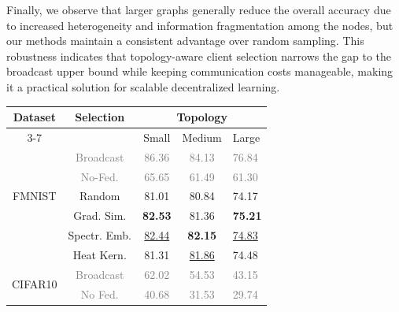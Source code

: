 \documentclass[journal]{IEEEtran}
\begin{document}
Finally, we observe that larger graphs generally reduce the overall accuracy due to increased heterogeneity and information fragmentation among the nodes, but our methods maintain a consistent advantage over random sampling. This robustness indicates that topology-aware client selection narrows the gap to the broadcast upper bound while keeping communication costs manageable, making it a practical solution for scalable decentralized learning.
\begin{table}[]
\centering
\begin{tabular}{|c|c|clcll|}
\hline
\multirow{2}{*}{Dataset} & \multirow{2}{*}{Selection}  & \multicolumn{5}{c|}{Topology}                                                                           \\ \cline{3-7} 
                         &                             & \multicolumn{2}{c|}{Small }             & \multicolumn{2}{c|}{Medium }            & Large \\ \hline
\multirow{5}{*}{FMNIST}  & \textcolor{gray}{Broadcast} & \multicolumn{2}{c}{\textcolor{gray}{86.36}} & \multicolumn{2}{c}{\textcolor{gray}{84.13}} & \textcolor{gray}{76.84}            \\
                         & \textcolor{gray}{No-Fed.}   & \multicolumn{2}{c}{\textcolor{gray}{65.65}} & \multicolumn{2}{c}{\textcolor{gray}{61.49}} & \textcolor{gray}{61.30}            \\
                         & Random                      & \multicolumn{2}{c}{81.01}                   & \multicolumn{2}{c}{80.84}                   &  74.17           \\
                         & Grad. Sim.                  & \multicolumn{2}{c}{\textbf{82.53}}          & \multicolumn{2}{c}{81.36}                   &  \textbf{75.21}          \\
                         & Spectr. Emb.                & \multicolumn{2}{c}{\underline{82.44}}        & \multicolumn{2}{c}{\textbf{82.15}}         &  \underline{74.83}           \\
                         & Heat Kern.                  & \multicolumn{2}{c}{81.31}                   & \multicolumn{2}{c}{\underline{81.86}}       &  74.48           \\ \hline
\multirow{5}{*}{CIFAR10} & \textcolor{gray}{Broadcast} & \multicolumn{2}{c}{\textcolor{gray}{62.02}} & \multicolumn{2}{c}{\textcolor{gray}{54.53}} & \textcolor{gray}{43.15}           \\
                         & \textcolor{gray}{No Fed.}   & \multicolumn{2}{c}{\textcolor{gray}{40.68}} & \multicolumn{2}{c}{\textcolor{gray}{31.53}} & \textcolor{gray}{29.74}            \\

\end{tabular}
\end{table}
\end{document}
